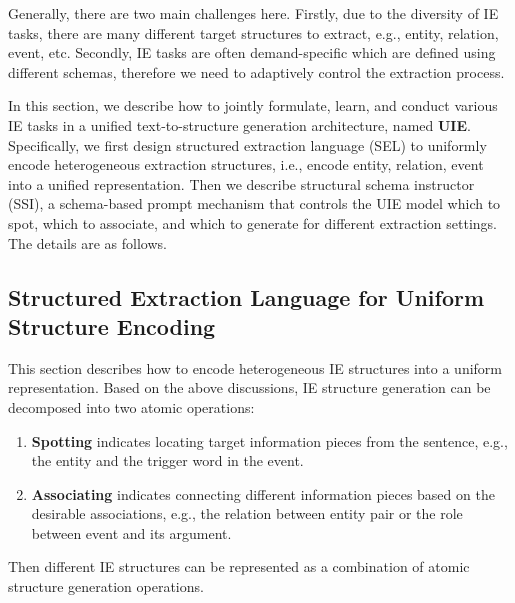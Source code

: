 \documentclass[11pt]{article}
\begin{document}
Generally, there are two main challenges here.
Firstly, due to the diversity of IE tasks, there are many different target structures to extract, e.g., entity, relation, event, etc.
Secondly, IE tasks are often demand-specific which are defined using different schemas, therefore we need to adaptively control the extraction process.

In this section, we describe how to jointly formulate, learn, and conduct various IE tasks in a unified text-to-structure generation architecture, named \textbf{UIE}. 
Specifically, we first design structured extraction language (SEL) to uniformly encode heterogeneous extraction structures, i.e., encode entity, relation, event into a unified representation.
Then we  describe structural schema instructor (SSI), a schema-based prompt mechanism that controls the UIE model which to spot, which to associate, and which to generate for different extraction settings. 
The details are as follows.

\subsection{Structured Extraction Language for Uniform Structure Encoding} \label{sec:structured_language}
This section describes how to encode heterogeneous IE structures into a uniform representation.
Based on the above discussions, IE structure generation can be decomposed into two atomic operations:
\begin{enumerate}[nosep,leftmargin=*]
    \item
    \textbf{Spotting} indicates locating target information pieces from the sentence, e.g., the entity and the trigger word in the event.
    \item
    \textbf{Associating} indicates connecting different information pieces based on the desirable associations, e.g., the relation between entity pair or the role between event and its argument.
\end{enumerate}
Then different IE structures can be represented as a combination of atomic structure generation operations.
\end{document}
